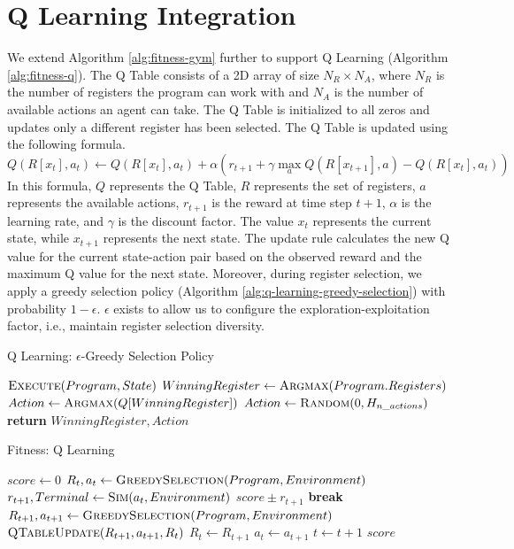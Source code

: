 \documentclass[12pt, final]{dalcsthesis}
\begin{document}
\section{Q Learning Integration}
We extend Algorithm \ref{alg:fitness-gym} further to support Q Learning (Algorithm \ref{alg:fitness-q}).
The Q Table consists of a 2D array of size $N_R \times N_A$, where $N_R$ is the number of registers the program can work with and $N_A$ is the number of available actions an agent can take. The Q Table is initialized to all zeros and updates only a different register has been selected. The Q Table is updated using the following formula.
\begin{equation}
	Q(R[x_t], a_t) \leftarrow Q(R[x_t], a_t) + \alpha \left(r_{t+1} + \gamma \max_a Q(R[x_{t+1}], a) - Q(R[x_t], a_t)\right)
\end{equation}
In this formula, $Q$ represents the Q Table, $R$ represents the set of registers, $a$ represents the available actions, $r_{t+1}$ is the reward at time step $t+1$, $\alpha$ is the learning rate, and $\gamma$ is the discount factor. The value $x_t$ represents the current state, while $x_{t+1}$ represents the next state. The update rule calculates the new Q value for the current state-action pair based on the observed reward and the maximum Q value for the next state.
Moreover, during register selection, we apply a greedy selection policy (Algorithm \ref{alg:q-learning-greedy-selection}) with probability $1-\epsilon$. $\epsilon$ exists to allow us to configure the exploration-exploitation factor, i.e., maintain register selection diversity.

\begin{algorithm}[b]
	\caption{Q Learning: $\epsilon$-Greedy Selection Policy}
	\label{alg:q-learning-greedy-selection}
	\begin{algorithmic}[1]
		\State $\Call{Execute}{Program, State}$
		\State $WinningRegister \gets \Call{Argmax}{Program.Registers} $
		\State $Action \gets \Call{Argmax}{Q[WinningRegister]}$
		\State $Action \gets \Call{Random}{0, H_{n\_actions}}$
		\EndIf
		\State \textbf{return} $WinningRegister, Action$
	\end{algorithmic}
\end{algorithm}
\begin{algorithm}[b]
	\caption{Fitness: Q Learning}
	\label{alg:fitness-q}
	\begin{algorithmic}[1]
		\State $score \gets 0$
		\State $R_{t}, a_{t} \gets \Call{GreedySelection}{Program, Environment}$
		\State $r_{t + 1}, Terminal \gets \Call{Sim}{a_{t}, Environment}$
		\State $score \pm r_{t + 1}$
		\State \textbf{break}
		\EndIf
		\State $R_{t+1}, a_{t+1} \gets \Call{GreedySelection}{Program, Environment}$
		\State $\Call{QTableUpdate}{R_{t+1}, a_{t+1}, R_{t}}$
		\EndIf
		\State ${R_{t} \leftarrow R_{t+1}}$
		\State ${a_{t} \leftarrow a_{t+1}}$
		\State ${t \leftarrow t+1}$
		\EndWhile
		\State \Return $score$
	\end{algorithmic}
\end{algorithm}
\end{document}
